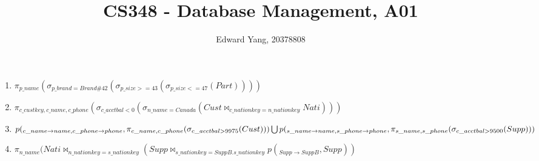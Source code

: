 \documentclass[12pt, oneside]{article}   	%
\title{CS348 - Database Management, A01}
\author{Edward Yang, 20378808}
\begin{document}
\maketitle
\begin{enumerate}
\item $\pi_{p\_name}(\sigma_{p\_brand=Brand\#42} (\sigma_{p\_size >= 43} (\sigma_{p\_size <= 47}(Part))))$
\item $\pi_{c\_custkey, c\_name, c\_phone} (\sigma_{c\_acctbal < 0} (\sigma_{n\_name=Canada}(Cust \Join_{c\_nationkey = n\_nationkey} Nati)))$
\item $p(_{c\_name \to name, c\_phone \to phone},\pi_{c\_name, c\_phone} (\sigma_{c\_acctbal > 9975} (Cust))) \bigcup 
\\ p(_{s\_name \to name, s\_phone \to phone},\pi_{s\_name, s\_phone} (\sigma_{c\_acctbal > 9500} (Supp)))$
\item $\pi_{n\_name}(Nati\Join_{n\_nationkey = s\_nationkey}(Supp\Join_{s\_nationkey=SuppB.s\_nationkey}p(_{Supp\to SuppB}, Supp))$
\end{enumerate}
\end{document}
